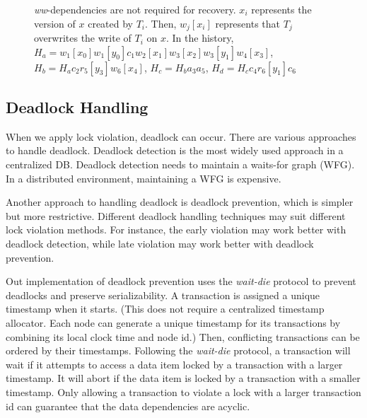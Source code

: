 \documentclass[conference]{IEEEtran}
\begin{document}
\begin{figure}[tbp]
  \caption{\emph{ww}-dependencies are not required for recovery.
  ${x_i}$ represents the version of $x$ created by ${T_i}$.
 Then, $w_j[x_i]$ represents that ${T_j}$ overwrites the write of ${T_i}$ on $x$. In the history, ${H_a = w_1[x_0]w_1[y_0]c_1w_2[x_1]w_3[x_2]w_3[y_1]w_4[x_3]}$, 
 ${H_b = H_a c_2r_5[y_3]w_6[x_4]}$,
 ${H_c = H_b a_3a_5}$, 
 ${H_d = H_c c_4r_6[y_1]c_6}$
}
\label{fig:versions_example}
\end{figure}


\subsection {Deadlock Handling}
\label{sec:deadlock_handling}
When we apply lock violation, deadlock can occur.
There are various approaches to handle deadlock.
Deadlock detection is the most widely used approach in a centralized DB.
Deadlock detection needs to maintain a waits-for graph (WFG).
In a distributed environment, maintaining a WFG is expensive.


Another approach to handling deadlock is deadlock prevention, which is simpler but more restrictive.
Different deadlock handling techniques may suit different lock violation methods.
For instance, the early violation may work better with deadlock detection, while late violation may work better with deadlock prevention.

Out implementation of deadlock prevention uses the \emph{wait-die} protocol to prevent deadlocks and preserve serializability.
A transaction is assigned a unique timestamp when it starts.
(This does not require a centralized timestamp allocator.
Each node can generate a unique timestamp for its transactions by combining its local clock time and node id.)
Then, conflicting transactions can be ordered by their timestamps.
Following the \emph{wait-die} protocol, a transaction will wait if it attempts to access a data item locked by a transaction with a larger timestamp.
It will abort if the data item is locked by a transaction with a smaller timestamp.
Only allowing a transaction to violate a lock with a larger transaction id can guarantee that the data dependencies are acyclic.
\end{document}
